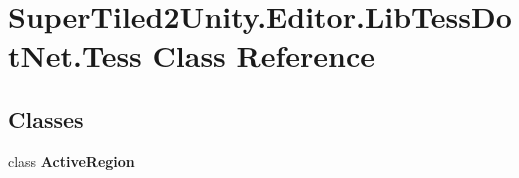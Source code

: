 \hypertarget{class_super_tiled2_unity_1_1_editor_1_1_lib_tess_dot_net_1_1_tess}{}\section{Super\+Tiled2\+Unity.\+Editor.\+Lib\+Tess\+Dot\+Net.\+Tess Class Reference}
\label{class_super_tiled2_unity_1_1_editor_1_1_lib_tess_dot_net_1_1_tess}
\subsection*{Classes}
\begin{DoxyCompactItemize}
\item 
class {\bfseries Active\+Region}
\end{DoxyCompactItemize}
